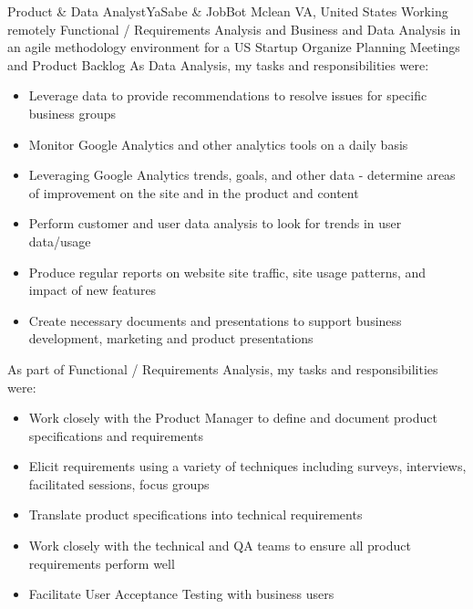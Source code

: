\documentclass[11pt,a4paper,sans]{moderncv}
\begin{document}
 {Product \& Data Analyst}{YaSabe \& JobBot  }{Mclean VA,  United States \- Working remotely}{}
{
Functional / Requirements Analysis and Business and Data Analysis in an agile methodology environment for a US Startup
  \newline{}
Organize Planning Meetings and Product Backlog
  \newline{}
}
{
  As  Data Analysis, my tasks and responsibilities were:
}
\begin{itemize}
  \item Leverage data to provide recommendations to resolve issues for specific business groups
  \item Monitor Google Analytics and other analytics tools on a daily basis
  \item Leveraging Google Analytics trends, goals, and other data - determine areas of improvement on the site and in the product and content
  \item Perform customer and user data analysis to look for trends in user data/usage
  \item Produce regular reports on website site traffic, site usage patterns, and impact of new features
  \item Create necessary documents and presentations to support business development, marketing and product presentations
 \newline{}
 \end{itemize}
{
  As part of  Functional / Requirements Analysis, my tasks and responsibilities were:
}
\begin{itemize}
  \item Work closely with the Product Manager to define and document product specifications and requirements
  \item Elicit requirements using a variety of techniques including surveys, interviews, facilitated sessions, focus groups
  \item Translate product specifications into technical requirements
  \item Work closely with the technical and QA teams to ensure all product requirements perform well
  \item Facilitate User Acceptance Testing with business users 
 \newline{}
\end{itemize}
\end{document}
